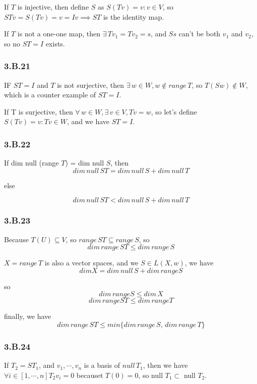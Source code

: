 If $T$ is injective, then define $S$ as $S(Tv) = v:v\in V$, so $STv = S(Tv) = v = Iv \implies ST$ is the identity map.

If $T$ is not a one-one map, then $\exists\, Tv_{1} = Tv_{2} = s$, and $Ss$ can't be both $v_{1}$ and $v_{2}$, so no $ST = I$ exists.

\subsubsection*{3.B.21}

IF $ST = I$ and $T$ is not surjective, then $\exists\,w \in W, w\notin range\,T$, so $T(Sw)\notin W$, which is a counter example of $ST = I$.

If T is surjective, then $\forall\,w \in W, \exists\,v\in V, Tv = w$, so let's define $S(Tv) = v: Tv\in W$, and we have $ST = I$.

\subsubsection*{3.B.22}

If dim null (range $T$) = dim null $S$, then 
\[dim\, null\, ST = dim\, null\, S + dim\,null\,T\]

else 

\[dim\, null\, ST < dim\, null\, S + dim\,null\,T\]

\subsubsection*{3.B.23}

Because $T(U) \subseteq V$, so $range\,ST\subseteq range\,S$, so 
\[dim\,range\,ST\leq dim\,range\,S\]

$X = range\, T$ is also a vector spaces, and we $S\in L(X, w)$, we have 
\[dim X = dim\, null\,S + dim\,range S\]

so 
\[dim\,range S \leq dim\,X\]
\[dim\,range ST \leq dim\,range T\]

finally, we have
\[dim\,range\,ST\leq min\{dim\,range\,S,\, dim\,range\,T\}\]

\subsubsection*{3.B.24}

If $T_{2} = ST_{1}$, and $v_{1},\cdots,v_{n}$ is a basis of $null\, T_{1}$, then we have $\forall i \in [1,\cdots,n] T_{2}v_{i}=0$ becauset $T(0) = 0$, so
    null $T_{1}\subset$ null $ T_{2}$.
    
